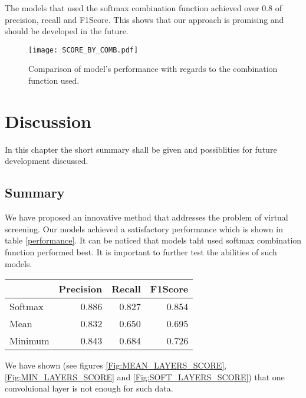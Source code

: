 \documentclass[a4paper,10pt]{report}
\begin{document}
      The models that used the softmax combination function achieved over 0.8 of precision, recall and F1Score. This shows that our approach is promising and should be developed in the future.
    
       \begin{figure}[h!]
	\centering
	\texttt{[image: SCORE\_BY\_COMB.pdf]}
	\caption{Comparison of model's performance with regards to the combination function used.}
	\label{SCORE_BY_COMB}
      \end{figure}
	    
  \chapter{Discussion}
    In this chapter the short summary shall be given and possiblities for future development discussed.
  
    \section{Summary}
    We have proposed an innovative method that addresses the problem of virtual screening. Our models achieved a satisfactory performance which is shown in table \ref{performance}. It can be noticed that models taht used softmax combination function performed best. It is important to further test the abilities of such models.
    
    \begin{tabular}{lrrr}
    \hline
             & Precision  & Recall   & F1Score  \\
    \hline
    Softmax  & 0.886      & 0.827    & 0.854   \\
    Mean     & 0.832      & 0.650    & 0.695   \\
    Minimum  & 0.843      & 0.684    & 0.726   \\
    \hline
    \end{tabular}\label{performance}
    
    We have shown (see figures \ref{Fig:MEAN_LAYERS_SCORE}, \ref{Fig:MIN_LAYERS_SCORE} and \ref{Fig:SOFT_LAYERS_SCORE}) that one convoluional layer is not enough for such data.
    
\end{document}
